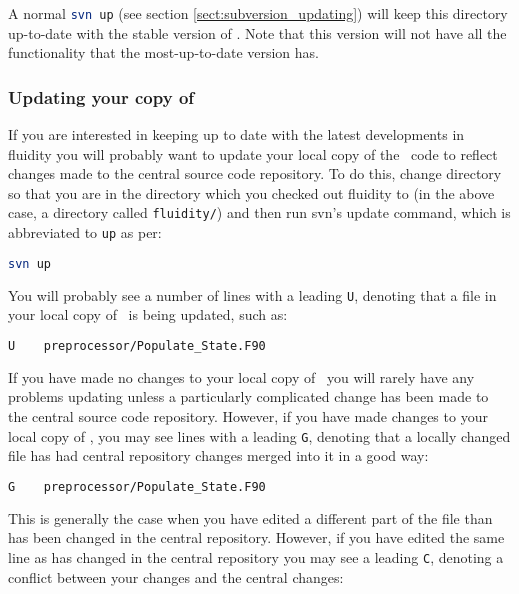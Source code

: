 A normal \lstinline[language=Bash]+svn up+ (see section \ref{sect:subversion_updating})
will keep this directory up-to-date
with the stable version of \fluidity. Note that this version will not have all
the functionality that the most-up-to-date version has.


\subsubsection{Updating your copy of \fluidity}
\label{sect:subversion_updating}

If you are interested in keeping up to date with the latest developments in
fluidity you will probably want to update your local copy of the \fluidity\ code
to reflect changes made to the central source code repository. To do this,
change directory so that you are in the directory which you checked out
fluidity to (in the above case, a directory called
\lstinline[language=Bash]+fluidity/+) and then run svn's update command, which
is abbreviated to \lstinline[language=Bash]+up+ as per:

\begin{lstlisting}[language=Bash]
svn up
\end{lstlisting}

You will probably see a number of lines with a leading
\lstinline[language=Bash]+U+, denoting that a file in your local copy of
\fluidity\ is being updated, such as:

\begin{lstlisting}[language=Bash]
U    preprocessor/Populate_State.F90
\end{lstlisting}

If you have made no changes to your local copy of \fluidity\ you will rarely have
any problems updating unless a particularly complicated change has been made to
the central source code repository. However, if you have made changes to your
local copy of \fluidity, you may see lines with a leading
\lstinline[language=Bash]+G+, denoting that a locally changed file has had
central repository changes merged into it in a good way:

\begin{lstlisting}[language=Bash]
G    preprocessor/Populate_State.F90
\end{lstlisting}

This is generally the case when you have edited a different part of the file
than has been changed in the central repository. However, if you have edited
the same line as has changed in the central repository you may see a leading
\lstinline[language=Bash]+C+, denoting a conflict between your changes and the
central changes:


